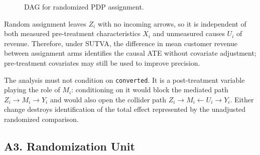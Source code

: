\documentclass[11pt]{article}
\begin{document}
\begin{figure}[ht]
    \centering
    \caption{DAG for randomized PDP assignment.}
    \label{fig:assignment-dag}
\end{figure}

Random assignment leaves $Z_i$ with no incoming arrows, so it is independent
of both measured pre-treatment characteristics $X_i$ and unmeasured causes
$U_i$ of revenue. Therefore, under SUTVA, the difference in mean customer
revenue between assignment arms identifies the causal ATE without covariate
adjustment; pre-treatment covariates may still be used to improve precision.

The analysis must not condition on \texttt{converted}. It is a
post-treatment variable playing the role of $M_i$: conditioning on it would
block the mediated path $Z_i\rightarrow M_i\rightarrow Y_i$ and would also
open the collider path $Z_i\rightarrow M_i\leftarrow U_i\rightarrow Y_i$.
Either change destroys identification of the total effect represented by the
unadjusted randomized comparison.

\subsection*{A3. Randomization Unit}
\end{document}
